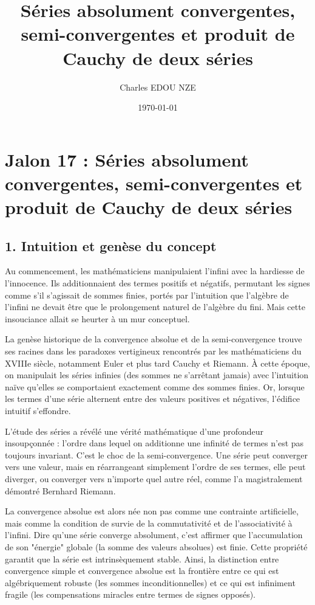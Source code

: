 \documentclass[12pt,a4paper]{report}
\title{Séries absolument convergentes, semi-convergentes et produit de Cauchy de deux séries}
\author{Charles EDOU NZE}
\date{\today}
\begin{document}
\maketitle
\tableofcontents


\chapter{Jalon 17 : Séries absolument convergentes, semi-convergentes et produit de Cauchy de deux séries}


\section{1. Intuition et genèse du concept}

Au commencement, les mathématiciens manipulaient l'infini avec la hardiesse de l'innocence. Ils additionnaient des termes positifs et négatifs, permutant les signes comme s'il s'agissait de sommes finies, portés par l'intuition que l'algèbre de l'infini ne devait être que le prolongement naturel de l'algèbre du fini. Mais cette insouciance allait se heurter à un mur conceptuel.

La genèse historique de la convergence absolue et de la semi-convergence trouve ses racines dans les paradoxes vertigineux rencontrés par les mathématiciens du XVIIIe siècle, notamment Euler et plus tard Cauchy et Riemann. À cette époque, on manipulait les séries infinies (des sommes ne s'arrêtant jamais) avec l'intuition naïve qu'elles se comportaient exactement comme des sommes finies. Or, lorsque les termes d'une série alternent entre des valeurs positives et négatives, l'édifice intuitif s'effondre.

L'étude des séries a révélé une vérité mathématique d'une profondeur insoupçonnée : l'ordre dans lequel on additionne une infinité de termes n'est pas toujours invariant. C'est le choc de la semi-convergence. Une série peut converger vers une valeur, mais en réarrangeant simplement l'ordre de ses termes, elle peut diverger, ou converger vers n'importe quel autre réel, comme l'a magistralement démontré Bernhard Riemann.

La convergence absolue est alors née non pas comme une contrainte artificielle, mais comme la condition de survie de la commutativité et de l'associativité à l'infini. Dire qu'une série converge absolument, c'est affirmer que l'accumulation de son "énergie" globale (la somme des valeurs absolues) est finie. Cette propriété garantit que la série est intrinsèquement stable. Ainsi, la distinction entre convergence simple et convergence absolue est la frontière entre ce qui est algébriquement robuste (les sommes inconditionnelles) et ce qui est infiniment fragile (les compensations miracles entre termes de signes opposés).
\end{document}
